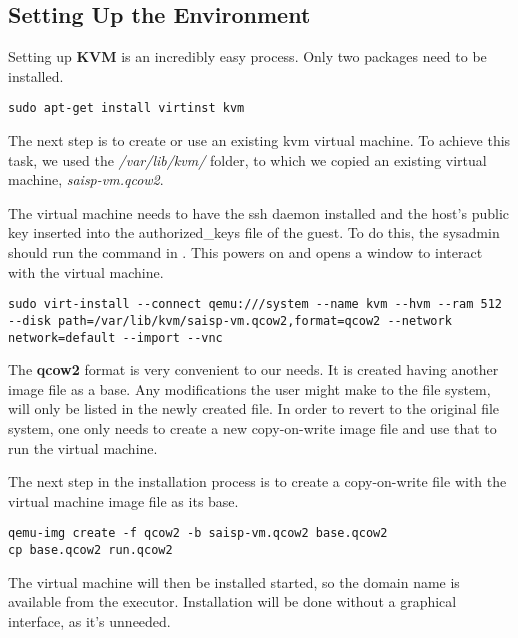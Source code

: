 \subsection{Setting Up the Environment}
\label{sub-sec:vmc-kvm-setup}

Setting up \textbf{KVM} is an incredibly easy process. Only two packages need
to be installed.

\lstset{caption=Install the Needed Packages, label=lst:kvm-deps}
\begin{lstlisting}
sudo apt-get install virtinst kvm
\end{lstlisting}

The next step is to create or use an existing kvm virtual machine.
To achieve this task, we used the \textit{/var/lib/kvm/} folder, to which
we copied an existing virtual machine, \textit{saisp-vm.qcow2}.

The virtual machine needs to have the ssh daemon installed and the host's
public key inserted into the authorized_keys file of the guest. To do this,
the sysadmin should run the command in .
This powers on and opens a window to interact with the virtual machine.

\lstset{caption=Initial run of the virtual machine, label=lst:kvm-run}
\begin{lstlisting}
sudo virt-install --connect qemu:///system --name kvm --hvm --ram 512 --disk path=/var/lib/kvm/saisp-vm.qcow2,format=qcow2 --network network=default --import --vnc
\end{lstlisting}

The {\bf qcow2} format is very convenient to our needs. It is created having
another image file as a base. Any modifications the user might make to the
file system, will only be listed in the newly created file. In order to
revert to the original file system, one only needs to create a new
copy-on-write image file and use that to run the virtual machine.

The next step in the installation process is to create a copy-on-write file 
with the virtual machine image file as its base.

\lstset{caption=Creating the Target File, label=lst:kvm-base}
\begin{lstlisting}
qemu-img create -f qcow2 -b saisp-vm.qcow2 base.qcow2
cp base.qcow2 run.qcow2
\end{lstlisting}

The virtual machine will then be installed started, so the domain name is available
from the executor. Installation will be done without a graphical interface, 
as it's unneeded.


